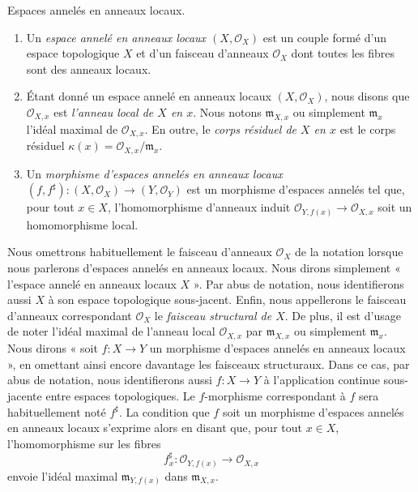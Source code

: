 \begin{definition}
\label{definition-locally-ringed-space}
Espaces annelés en anneaux locaux.
\begin{enumerate}
\item Un {\it espace annelé en anneaux locaux $(X, \mathcal{O}_X)$}
est un couple formé d'un
espace topologique $X$ et d'un faisceau d'anneaux $\mathcal{O}_X$ dont toutes les fibres
sont des anneaux locaux.
\item Étant donné un espace annelé en anneaux locaux $(X, \mathcal{O}_X)$, nous disons que
$\mathcal{O}_{X, x}$ est {\it l'anneau local de $X$ en $x$}.
Nous notons $\mathfrak{m}_{X, x}$ ou simplement $\mathfrak{m}_x$
l'idéal maximal de $\mathcal{O}_{X, x}$. En outre, le
{\it corps résiduel de $X$ en $x$} est le corps résiduel
$\kappa(x) = \mathcal{O}_{X, x}/\mathfrak{m}_x$.
\item Un {\it morphisme d'espaces annelés en anneaux locaux}
$(f, f^\sharp) : (X, \mathcal{O}_X) \to (Y, \mathcal{O}_Y)$
est un morphisme d'espaces annelés tel que, pour tout $x \in X$,
l'homomorphisme d'anneaux induit $\mathcal{O}_{Y, f(x)} \to \mathcal{O}_{X, x}$ soit un
homomorphisme local.
\end{enumerate}
\end{definition}

\noindent
Nous omettrons habituellement le faisceau d'anneaux $\mathcal{O}_X$
de la notation lorsque nous parlerons d'espaces annelés en anneaux locaux. Nous dirons
simplement « l'espace annelé en anneaux locaux $X$ ».
Par abus de notation, nous identifierons aussi $X$ à
son espace topologique sous-jacent. Enfin, nous appellerons
le faisceau d'anneaux correspondant
$\mathcal{O}_X$ le {\it faisceau structural de $X$}.
De plus, il est d'usage de noter l'idéal maximal
de l'anneau local $\mathcal{O}_{X, x}$ par
$\mathfrak{m}_{X, x}$ ou simplement $\mathfrak{m}_x$.
Nous dirons « soit $f : X \to Y$ un morphisme d'espaces annelés en anneaux
locaux », en omettant ainsi encore davantage les faisceaux structuraux.
Dans ce cas, par abus de notation, nous identifierons aussi $f : X\to Y$
à l'application continue sous-jacente entre espaces topologiques.
Le $f$-morphisme correspondant à $f$ sera habituellement
noté $f^\sharp$. La condition que $f$ soit un morphisme
d'espaces annelés en anneaux locaux s'exprime alors en disant que,
pour tout $x\in X$, l'homomorphisme sur les fibres
$$
f^\sharp_x : \mathcal{O}_{Y, f(x)} \longrightarrow \mathcal{O}_{X, x}
$$
envoie l'idéal maximal $\mathfrak m_{Y, f(x)}$ dans
$\mathfrak m_{X, x}$.

